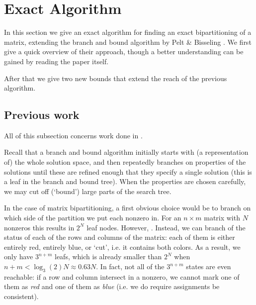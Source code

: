 \documentclass{article}
\begin{document}
	\section{Exact Algorithm}

	In this section we give an exact algorithm for finding an exact
	bipartitioning of a matrix, extending the branch and bound
	algorithm by Pelt \&
	Bisseling \cite{pelt-and-bisseling}. We first give a quick overview
	of their approach, though
	a better understanding can be gained by reading the
	paper itself.

	After that we give two new bounds that extend the reach of the previous
	algorithm.

	\subsection{Previous work}

	All of this subsection concerns work done in \cite{pelt-and-bisseling}.

	Recall that a branch and bound algorithm initially starts with
	(a representation of) the whole solution space, and then repeatedly
	branches on properties of the solutions until these are refined
	enough that they specify a single solution (this is a leaf in the branch
	and bound tree). When the properties are
	chosen carefully, we may cut off (`bound') large parts of the search
	tree.

	In the case of matrix bipartitioning, a first obvious choice would 
	be to branch on
	which side of the partition we put each nonzero in. For an $n \times m$
	matrix with $N$ nonzeros this results in $2^N$ leaf nodes. However,
	.
	Instead, we can branch of the status of each of the
	rows and columns of the matrix: each of them is either entirely red,
	entirely blue, or `cut', i.e. it contains both colors. As a result, we
	only have $3^{n+m}$ leafs, which is already smaller than $2^N$ when
	$n + m < \log_3(2) N \approx 0.63N$. In fact, not all of the $3^{n+m}$
	states are even reachable: if a row and column intersect in a nonzero,
	we cannot mark one of them as \textit{red} and one of them as \textit{blue}
	(i.e. we do require assignments be consistent).
\end{document}
